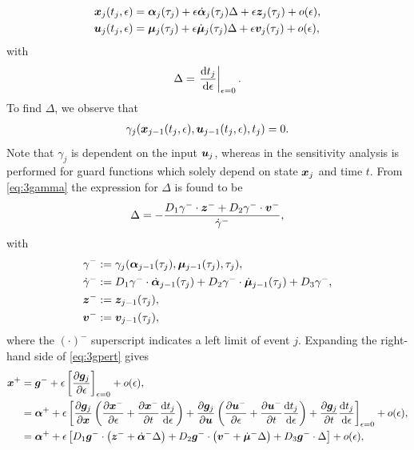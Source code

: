 \documentclass[../DC2019003Bouma.tex]{subfiles}
\begin{document}
\begin{align}
{\boldsymbol{x}}_j(t_{j},\epsilon) &= \boldsymbol{\alpha}_j(\tau_j) + \epsilon\dot{\boldsymbol{\alpha}}_j(\tau_j)\Delta + \epsilon{\boldsymbol{z}}_j(\tau_j) + o(\epsilon),\label{eq:3xexpand2}\\
{\boldsymbol{u}}_j(t_{j},\epsilon) &= \boldsymbol{\mu}_j(\tau_j) + \epsilon\dot{\boldsymbol{\mu}}_j(\tau_j)\Delta + \epsilon{\boldsymbol{v}}_j(\tau_j) + o(\epsilon),\label{eq:3uexpand2}
\end{align}
with
\begin{align}
\Delta = \left.\frac{\textnormal{d} t_{j}}{\textnormal{d}\epsilon}\right|_{\epsilon=0}.\label{eq:3Delta}
\end{align}
To find $\Delta$, we observe that
\begin{align}
\gamma_j({\boldsymbol{x}}_{j-1}(t_{j},\epsilon),{\boldsymbol{u}}_{j-1}(t_{j},\epsilon),t_{j}) = 0.\label{eq:3gamma}
\end{align}
Note that $\gamma_j$ is dependent on the input ${\boldsymbol{u}}_j$, whereas in \cite{Chen2018a} the sensitivity analysis is performed for guard functions which solely depend on state ${\boldsymbol{x}}_j$ and time $t$. From \eqref{eq:3gamma} the expression for $\Delta$ is found to be
\begin{align}
\Delta = -\frac{D_1\gamma^{-}\cdot{\boldsymbol{z}}^- + D_2\gamma^{-}\cdot{\boldsymbol{v}}^-}{\dot{\gamma}^{-}},\label{eq:3Deltaj}
\end{align}
with
\begin{align*}
\gamma^- &:= \gamma_j(\boldsymbol{\alpha}_{j-1}(\tau_j),\boldsymbol{\mu}_{j-1}(\tau_j),\tau_j),\\
\dot{\gamma}^- &:= D_1\gamma^-\cdot\dot{\boldsymbol{\alpha}}_{j-1}(\tau_j) + D_2\gamma^-\cdot\dot{\boldsymbol{\mu}}_{j-1}(\tau_j) + D_3\gamma^-,\\
{\boldsymbol{z}}^- &:= {\boldsymbol{z}}_{j-1}(\tau_j),\\
{\boldsymbol{v}}^- &:= {\boldsymbol{v}}_{j-1}(\tau_j),
\end{align*}
where the $(\cdot)^-$ superscript indicates a left limit of event $j$. Expanding the right-hand side of \eqref{eq:3gpert} gives
\begin{align}
{\boldsymbol{x}}^+ &= {\boldsymbol{g}}^- + \epsilon\left[\frac{\partial{\boldsymbol{g}}_j}{\partial\epsilon}\right]_{\epsilon=0} + o(\epsilon),\\
&= \boldsymbol{\alpha}^+ + \epsilon\left[\frac{\partial{\boldsymbol{g}}_j}{\partial{\boldsymbol{x}}}\left(\frac{\partial{\boldsymbol{x}}^-}{\partial\epsilon} + \frac{\partial{\boldsymbol{x}}^-}{\partial t}\frac{\text{d}t_j}{\text{d}\epsilon} \right) + \frac{\partial{\boldsymbol{g}}_j}{\partial{\boldsymbol{u}}}\left(\frac{\partial{\boldsymbol{u}}^-}{\partial\epsilon} + \frac{\partial{\boldsymbol{u}}^-}{\partial t}\frac{\text{d} t_j}{\text{d}\epsilon}\right) + \frac{\partial{\boldsymbol{g}}_j}{\partial t}\frac{\text{d} t_j}{\text{d}\epsilon} \right]_{\epsilon = 0} + o(\epsilon),\\
&= \boldsymbol{\alpha}^+ + \epsilon\left[D_1{\boldsymbol{g}}^-\cdot \left({\boldsymbol{z}}^- + \dot{\boldsymbol{\alpha}}^-\Delta\right) + D_2{\boldsymbol{g}}^-\cdot \left({\boldsymbol{v}}^- + \dot{\boldsymbol{\mu}}^- \Delta\right) + D_3{\boldsymbol{g}}^-\cdot \Delta\right] + o(\epsilon),\label{eq:3gexp}
\end{align}
\end{document}
